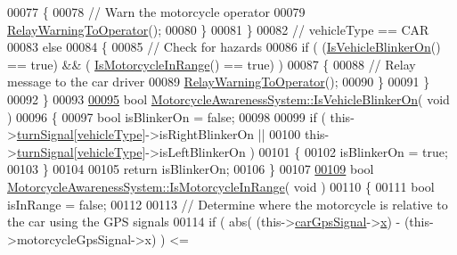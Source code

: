 \begin{DoxyCode}
00077         \{
00078             \textcolor{comment}{// Warn the motorcycle operator}
00079             \hyperlink{classMotorcycleAwarenessSystem_aec5e4731c6bf0789821ba2793918e3ee}{RelayWarningToOperator}();
00080         \}
00081     \}
00082     \textcolor{comment}{// vehicleType == CAR}
00083     \textcolor{keywordflow}{else}
00084     \{
00085         \textcolor{comment}{// Check for hazards}
00086         \textcolor{keywordflow}{if} ( (\hyperlink{classMotorcycleAwarenessSystem_a9c3f98a014b0af39fa120f478eb5f348}{IsVehicleBlinkerOn}() == \textcolor{keyword}{true}) && (
      \hyperlink{classMotorcycleAwarenessSystem_a239655aca9c875b1dbbad3ce155c7892}{IsMotorcycleInRange}() == \textcolor{keyword}{true}) )
00087         \{
00088             \textcolor{comment}{// Relay message to the car driver}
00089             \hyperlink{classMotorcycleAwarenessSystem_aec5e4731c6bf0789821ba2793918e3ee}{RelayWarningToOperator}();
00090         \}
00091     \}
00092 \}
00093 
\hypertarget{MotorcycleAwarenessSystem_8cpp_source_l00095}{}\hyperlink{classMotorcycleAwarenessSystem_a9c3f98a014b0af39fa120f478eb5f348}{00095} \textcolor{keywordtype}{bool} \hyperlink{classMotorcycleAwarenessSystem_a9c3f98a014b0af39fa120f478eb5f348}{MotorcycleAwarenessSystem::IsVehicleBlinkerOn}( \textcolor{keywordtype}{void} )
00096 \{
00097     \textcolor{keywordtype}{bool} isBlinkerOn = \textcolor{keyword}{false};
00098 
00099     \textcolor{keywordflow}{if} ( this->\hyperlink{classMotorcycleAwarenessSystem_a43fde090639a3a58fc5bbf8bafc966f7}{turnSignal}[\hyperlink{classMotorcycleAwarenessSystem_a977b2085bfbf6a62902bf2d80160e6d2}{vehicleType}]->isRightBlinkerOn ||
00100          this->\hyperlink{classMotorcycleAwarenessSystem_a43fde090639a3a58fc5bbf8bafc966f7}{turnSignal}[\hyperlink{classMotorcycleAwarenessSystem_a977b2085bfbf6a62902bf2d80160e6d2}{vehicleType}]->isLeftBlinkerOn )
00101     \{
00102         isBlinkerOn = \textcolor{keyword}{true};
00103     \}
00104 
00105     \textcolor{keywordflow}{return} isBlinkerOn;
00106 \}
00107 
\hypertarget{MotorcycleAwarenessSystem_8cpp_source_l00109}{}\hyperlink{classMotorcycleAwarenessSystem_a239655aca9c875b1dbbad3ce155c7892}{00109} \textcolor{keywordtype}{bool} \hyperlink{classMotorcycleAwarenessSystem_a239655aca9c875b1dbbad3ce155c7892}{MotorcycleAwarenessSystem::IsMotorcycleInRange}( \textcolor{keywordtype}{void} )
00110 \{
00111     \textcolor{keywordtype}{bool} isInRange = \textcolor{keyword}{false};
00112 
00113     \textcolor{comment}{// Determine where the motorcycle is relative to the car using the GPS signals}
00114     \textcolor{keywordflow}{if} ( abs( (this->\hyperlink{classMotorcycleAwarenessSystem_a9a8185e00b60d0be58bfa76166063128}{carGpsSignal}->\hyperlink{structGpsSignal__t_a6f7bd3c500b55923ab335ada4b6b26eb}{x}) - (this->motorcycleGpsSignal->x) ) <= 

\end{DoxyCode}

